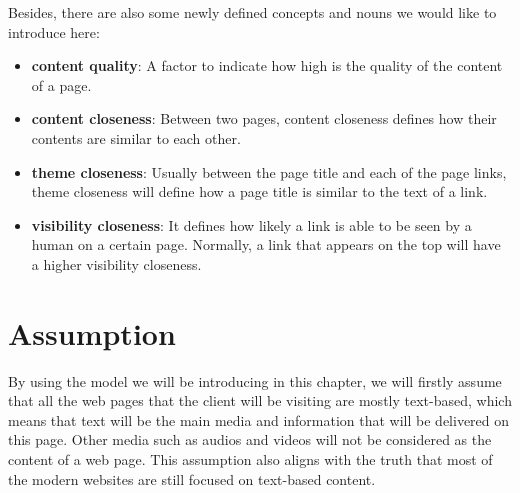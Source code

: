 \documentclass[12pt]{report}
\begin{document}
Besides, there are also some newly defined concepts and nouns we would like to introduce here:

\begin{itemize}
\item \textbf{content quality}: A factor to indicate how high is the quality of the content of a page.


\item \textbf{content closeness}: Between two pages, content closeness defines how their contents are similar to each other.

\item \textbf{theme closeness}: Usually between the page title and each of the page links, theme closeness will define how a page title is similar to the text of a link.

\item \textbf{visibility closeness}: It defines how likely a link is able to be seen by a human on a certain page. Normally, a link that appears on the top will have a higher visibility closeness.

\end{itemize}

\section{Assumption}
By using the model we will be introducing in this chapter, we will firstly assume that all the web pages that the client will be visiting are mostly text-based, which means that text will be the main media and information that will be delivered on this page. Other media such as audios and videos will not be considered as the content of a web page. This assumption also aligns with the truth that most of the modern websites are still focused on text-based content.
\end{document}
